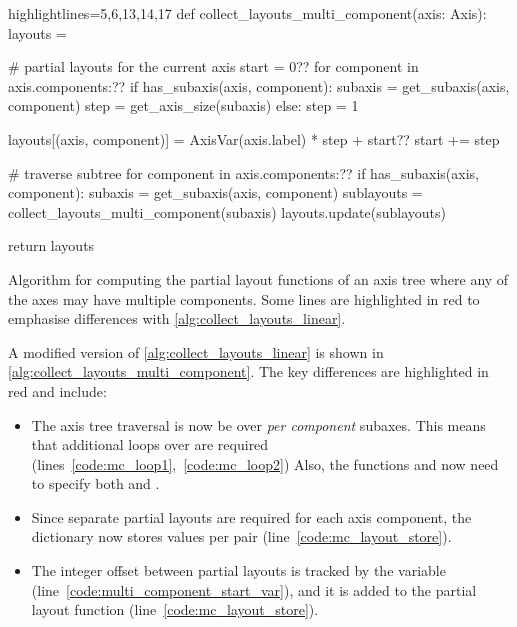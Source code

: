 \documentclass[thesis]{subfiles}
\begin{document}
\begin{algorithm}
  \begin{center}
    \begin{minipage}{.9\textwidth}
      \begin{pyalg2*}{highlightlines={5,6,13,14,17}}
        def collect_layouts_multi_component(axis: Axis):
          layouts = {}

          # partial layouts for the current axis
          start = 0?\label{code:multi_component_start_var}?
          for component in axis.components:?\label{code:mc_loop1}?
            if has_subaxis(axis, component):
              subaxis = get_subaxis(axis, component)
              step = get_axis_size(subaxis)
            else:
              step = 1

            layouts[(axis, component)] = AxisVar(axis.label) * step + start?\label{code:mc_layout_store}?
            start += step

          # traverse subtree
          for component in axis.components:?\label{code:mc_loop2}?
            if has_subaxis(axis, component): 
              subaxis = get_subaxis(axis, component)
              sublayouts = collect_layouts_multi_component(subaxis)
              layouts.update(sublayouts)

          return layouts
      \end{pyalg2*}
    \end{minipage}
  \end{center}

  \caption{
    Algorithm for computing the partial layout functions of an axis tree where any of the axes may have multiple components.
    Some lines are highlighted in red to emphasise differences with \cref{alg:collect_layouts_linear}.
  }
  \label{alg:collect_layouts_multi_component}
\end{algorithm}

A modified version of \cref{alg:collect_layouts_linear} is shown in \cref{alg:collect_layouts_multi_component}.
The key differences are highlighted in red and include:

\begin{itemize}
  \item
    The axis tree traversal is now be over \emph{per component} subaxes.
    This means that additional loops over  are required (lines~\ref{code:mc_loop1},~\ref{code:mc_loop2})
    Also, the functions  and  now need to specify both  and .

  \item
    Since separate partial layouts are required for each axis component, the  dictionary now stores values per  pair (line~\ref{code:mc_layout_store}).

  \item
    The integer offset between partial layouts is tracked by the  variable (line~\ref{code:multi_component_start_var}), and it is added to the partial layout function (line~\ref{code:mc_layout_store}).
\end{itemize}
\end{document}
